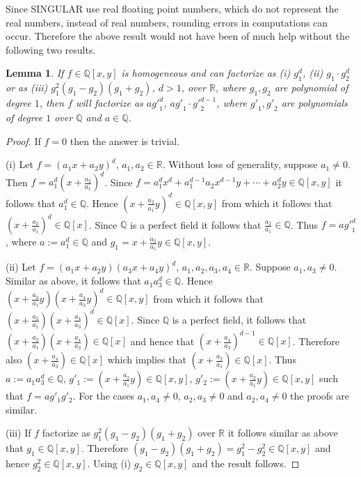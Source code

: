 \documentclass{amsproc}
\begin{document}
Since SINGULAR use real floating point numbers, which do not represent the real numbers, instead of real numbers, rounding errors in computations can occur. Therefore the above result would not have been of much help without the following two results. 
\newtheorem{x^3}[kjet]{Lemma}
\begin{x^3}\label{x^3}
If $f\in\mathbb Q[x,y]$ is homogeneous and can factorize as (i) $g_1^d$, (ii) $g_1\cdot g_2^{d}$ or as  (iii) $g_1^2(g_1-g_2)(g_1+g_2)$, $d>1$, over $\mathbb R$, where $g_1,g_2$ are polynomial of degree $1$, then $f$ will factorize as $a{g'}_1^d$, $a{g'}_1\cdot {g'}_2^{d-1}$, where ${g'}_1,{g'}_2$ are polynomials of degree $1$ over $\mathbb Q$ and $a\in\mathbb Q$.
\end{x^3}
\begin{proof}
If $f=0$ then the answer is trivial.

(i) Let $f=(a_1x+a_2y)^d$, $a_1,a_2\in\mathbb R$. Without loss of generality, suppose $a_1\neq 0$. Then $f=a_1^d(x+\frac{a_2}{a_1})^d$. Since $f= a_1^dx^d+a_1^{d-1}a_2x^{d-1}y+\cdots+a_2^dy\in\mathbb Q[x,y]$ it follows that $a_1^d\in\mathbb Q$. Hence $(x+\frac{a_2}{a_1}y)^d\in\mathbb Q[x,y]$ from which it follows that $(x+\frac{a_2}{a_1})^d\in\mathbb Q[x]$. Since $\mathbb Q$ is a perfect field it follows that $\frac{a_2}{a_1}\in\mathbb Q$. Thus $f=a{g'}_1^d$, where $a:=a_1^d\in\mathbb Q$ and $g_1=x+\frac{a_2}{a_1}y\in\mathbb Q[x,y]$.

(ii) Let $f=(a_1x+a_2y)(a_3x+a_4y)^{d}$, $a_1,a_2,a_3,a_4\in\mathbb R$. Suppose $a_1,a_3\neq 0$. Similar as above, it follows that $a_1a_3^{d}\in\mathbb Q$. Hence $(x+\frac{a_2}{a_1}y)(x+\frac{a_4}{a_3}y)^d\in\mathbb Q[x,y]$ from which it follows that $(x+\frac{a_2}{a_1})(x+\frac{a_4}{a_3})^d\in\mathbb Q[x]$. Since $\mathbb Q$ is a perfect field, it follows that $(x+\frac{a_2}{a_1})(x+\frac{a_4}{a_3})\in\mathbb Q[x]$ and hence that $(x+\frac{a_4}{a_3})^{d-1}\in\mathbb Q[x]$. Therefore also $(x+\frac{a_4}{a_3})\in\mathbb Q[x]$ which implies that $(x+\frac{a_2}{a_1})\in\mathbb Q[x]$. Thus $a:=a_1a_3^d\in\mathbb Q$, $g'_1:=(x+\frac{a_2}{a_1}y)\in\mathbb Q[x,y]$, $g'_2:=(x+\frac{a_2}{a_1}y)\in\mathbb Q[x,y]$ such that $f=ag'_1g'_2$. For the cases $a_1,a_4\neq 0$, $a_2,a_3\neq 0$ and $a_2,a_4\neq 0$ the proofs are similar.

(iii) If $f$ factorize as $g_1^2(g_1-g_2)(g_1+g_2)$ over $\mathbb R$ it follows similar as above that $g_1\in\mathbb Q[x,y]$. Therefore $(g_1-g_2)(g_1+g_2)=g_1^2-g_2^2\in\mathbb Q[x,y]$ and hence $g_2^2\in\mathbb Q[x,y]$. Using (i) $g_2\in\mathbb Q[x,y]$ and the result follows.
\end{proof}
\end{document}
